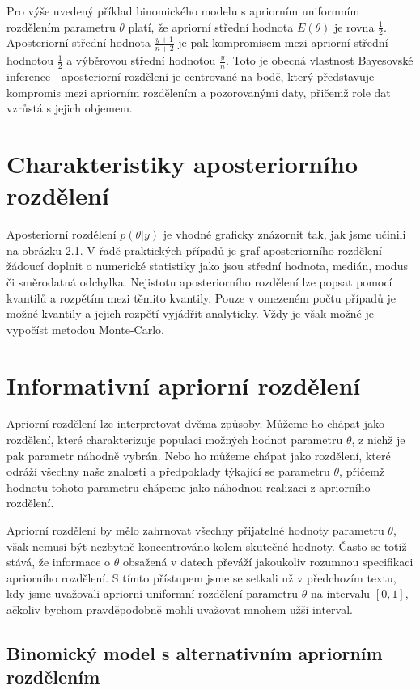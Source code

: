 Pro výše uvedený příklad binomického modelu s apriorním uniformním rozdělením parametru $\theta$ platí, že apriorní střední hodnota $E(\theta)$ je rovna $\frac{1}{2}$. Aposteriorní střední hodnota $\frac{y + 1}{n + 2}$ je pak kompromisem mezi apriorní střední hodnotou $\frac{1}{2}$ a výběrovou střední hodnotou $\frac{y}{n}$. Toto je obecná vlastnost Bayesovské inference - aposteriorní rozdělení je centrované na bodě, který představuje kompromis mezi apriorním rozdělením a pozorovanými daty, přičemž role dat vzrůstá s jejich objemem.

\section{Charakteristiky aposteriorního rozdělení}

Aposteriorní rozdělení $p(\theta | y)$ je vhodné graficky znázornit tak, jak jsme učinili na obrázku 2.1. V řadě praktických případů je graf aposteriorního rozdělení žádoucí doplnit o numerické statistiky jako jsou střední hodnota, medián, modus či směrodatná odchylka. Nejistotu aposteriorního rozdělení lze popsat pomocí kvantilů a rozpětím mezi těmito kvantily. Pouze v omezeném počtu případů je možné kvantily a jejich rozpětí vyjádřit analyticky. Vždy je však možné je vypočíst metodou Monte-Carlo.

\section{Informativní apriorní rozdělení}

Apriorní rozdělení lze interpretovat dvěma způsoby. Můžeme ho chápat jako rozdělení, které charakterizuje populaci možných hodnot parametru $\theta$, z nichž je pak parametr náhodně vybrán. Nebo ho můžeme chápat jako rozdělení, které odráží všechny naše znalosti a předpoklady týkající se parametru $\theta$, přičemž hodnotu tohoto parametru chápeme jako náhodnou realizaci z apriorního rozdělení.

Apriorní rozdělení by mělo zahrnovat všechny přijatelné hodnoty parametru $\theta$, však nemusí být nezbytně koncentrováno kolem skutečné hodnoty. Často se totiž stává, že informace o $\theta$ obsažená v datech převáží jakoukoliv rozumnou specifikaci apriorního rozdělení. S tímto přístupem jsme se setkali už v předchozím textu, kdy jsme uvažovali apriorní uniformní rozdělení parametru $\theta$ na intervalu $[0, 1]$, ačkoliv bychom pravděpodobně mohli uvažovat mnohem užší interval.

\subsection{Binomický model s alternativním apriorním rozdělením}

